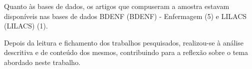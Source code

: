 Quanto às bases de dados, os artigos que compuseram a amostra estavam disponíveis nas bases de dados \acrlong{BDENF} (\acrshort{BDENF}) - Enfermagem (5) e \acrlong{LILACS} (\acrshort{LILACS}) (1).

Depois da leitura e fichamento dos trabalhos pesquisados, realizou-se à análise descritiva e de conteúdo dos mesmos, contribuindo para a reflexão sobre o tema abordado neste trabalho. 







